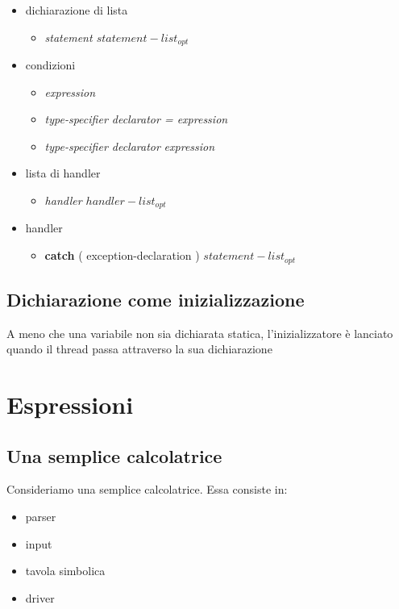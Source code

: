 \documentclass[11pt,a4paper]{book}
\begin{document}
\begin{itemize}
	\item dichiarazione di lista
	\begin{itemize}
		\item \textit{statement $statement-list_{opt}$}
	\end{itemize}
	
	\item condizioni
	\begin{itemize}
		\item \textit{expression}
		\item \textit{type-specifier declarator = expression}
		\item \textit{type-specifier declarator} { \textit{expression} }
	\end{itemize}
	
	\item lista di handler
	\begin{itemize}
		\item \textit{handler $handler-list_{opt}$}
	\end{itemize}
	
	\item handler
	\begin{itemize}
		\item \textbf{catch} ( exception-declaration ) { \textit{$statement-list_{opt}$}}
	\end{itemize}
\end{itemize}

\section{Dichiarazione come inizializzazione}
A meno che una variabile non sia dichiarata statica, l'inizializzatore è lanciato quando il thread passa attraverso la sua dichiarazione

\chapter{Espressioni}
\section{Una semplice calcolatrice}
Consideriamo una semplice calcolatrice. Essa consiste in:
\begin{itemize}
	\item parser
	\item input
	\item tavola simbolica
	\item driver
\end{itemize}
\end{document}
